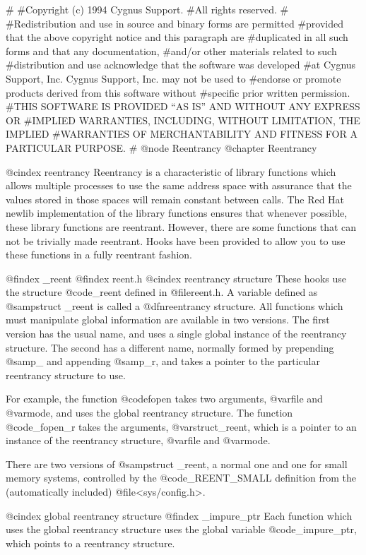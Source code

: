 #
#Copyright (c) 1994 Cygnus Support.
#All rights reserved.
#
#Redistribution and use in source and binary forms are permitted
#provided that the above copyright notice and this paragraph are
#duplicated in all such forms and that any documentation,
#and/or other materials related to such
#distribution and use acknowledge that the software was developed
#at Cygnus Support, Inc.  Cygnus Support, Inc. may not be used to
#endorse or promote products derived from this software without
#specific prior written permission.
#THIS SOFTWARE IS PROVIDED ``AS IS'' AND WITHOUT ANY EXPRESS OR
#IMPLIED WARRANTIES, INCLUDING, WITHOUT LIMITATION, THE IMPLIED
#WARRANTIES OF MERCHANTABILITY AND FITNESS FOR A PARTICULAR PURPOSE.
#
@node Reentrancy
@chapter Reentrancy

@cindex reentrancy
Reentrancy is a characteristic of library functions which allows multiple
processes to use the same address space with assurance that the values stored
in those spaces will remain constant between calls. The Red Hat
newlib implementation of the library functions ensures that 
whenever possible, these library functions are reentrant.  However,
there are some functions that can not be trivially made reentrant.
Hooks have been provided to allow you to use these functions in a fully
reentrant fashion.

@findex _reent
@findex reent.h
@cindex reentrancy structure
These hooks use the structure @code{_reent} defined in @file{reent.h}.
A variable defined as @samp{struct _reent} is called a @dfn{reentrancy
structure}.  All functions which must manipulate global information are
available in two versions.  The first version has the usual name, and
uses a single global instance of the reentrancy structure.  The second
has a different name, normally formed by prepending @samp{_} and
appending @samp{_r}, and takes a pointer to the particular reentrancy
structure to use.

For example, the function @code{fopen} takes two arguments, @var{file}
and @var{mode}, and uses the global reentrancy structure.  The function
@code{_fopen_r} takes the arguments, @var{struct_reent}, which is a
pointer to an instance of the reentrancy structure, @var{file}
and @var{mode}.	

There are two versions of @samp{struct _reent}, a normal one and one
for small memory systems, controlled by the @code{_REENT_SMALL}
definition from the (automatically included) @file{<sys/config.h>}.

@cindex global reentrancy structure
@findex _impure_ptr
Each function which uses the global reentrancy structure uses the global
variable @code{_impure_ptr}, which points to a reentrancy structure.

